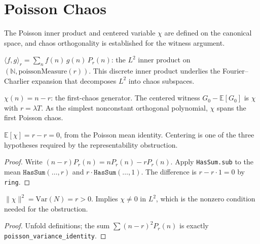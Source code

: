 \section{Poisson Chaos}

The Poisson inner product and centered variable $\chi$ are defined on the canonical space, and chaos orthogonality is established for the witness argument.

\begin{defn}\label{def:poisson_inner}
\leanok
$\langle f, g \rangle_r = \sum_n f(n)\,g(n)\,P_r(n)$: the $L^2$ inner product
on $(\mathbb{N}, \mathrm{poissonMeasure}(r))$.
This discrete inner product underlies the Fourier--Charlier expansion that decomposes $L^2$ into chaos subspaces.
\end{defn}

\begin{defn}\label{def:poisson_chi}
\leanok
$\chi(n) = n - r$: the first-chaos generator. The centered
witness $G_0 - \mathbb{E}[G_0]$ is $\chi$ with $r = \lambda T$.
As the simplest nonconstant orthogonal polynomial, $\chi$ spans the first Poisson chaos.
\end{defn}

\begin{theorem}\label{thm:chi_centered}
\leanok
{}
$\mathbb{E}[\chi] = r - r = 0$, from the Poisson mean identity.
Centering is one of the three hypotheses required by the representability obstruction.
\end{theorem}
\begin{proof}\leanok
Write $(n-r)P_r(n) = nP_r(n) - rP_r(n)$. Apply \texttt{HasSum.sub} to the
mean $\texttt{HasSum}(\ldots, r)$ and $r \cdot \texttt{HasSum}(\ldots, 1)$.
The difference is $r - r \cdot 1 = 0$ by \texttt{ring}.
\end{proof}

\begin{theorem}\label{thm:chi_norm}
\leanok
{}
$\|\chi\|^2 = \mathrm{Var}(N) = r > 0$.
Implies $\chi \neq 0$ in $L^2$, which is the nonzero condition needed for the obstruction.
\end{theorem}
\begin{proof}\leanok Unfold definitions; the sum $\sum (n-r)^2 P_r(n)$ is exactly \texttt{poisson\_variance\_identity}.\end{proof}

